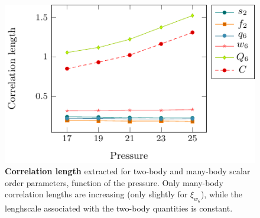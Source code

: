 \documentclass[twocolumn,superscriptaddress]{revtex4-1}
\begin{document}
\begin{figure}
	\centering
	\includegraphics{fig_lengths}
	\caption{\textbf{Correlation length} extracted for two-body and many-body scalar order parameters, function of the pressure. Only many-body correlation lengths are increasing (only slightly for $\xi_{w_6}$), while the lenghscale associated with the two-body quantities is constant.}
	\label{fig:Fourierlengths}
\end{figure}
\end{document}
